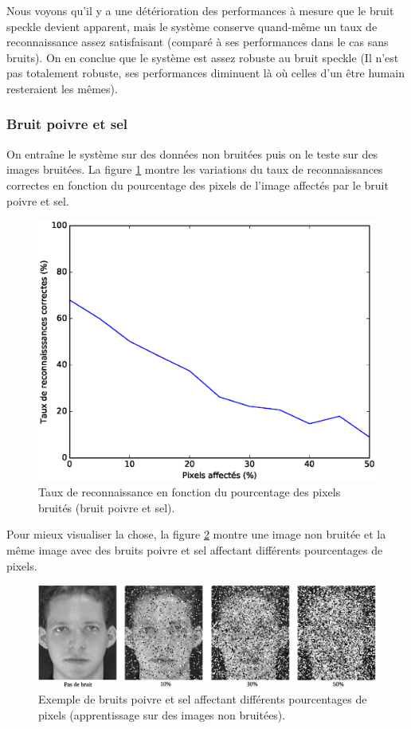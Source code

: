 Nous voyons qu'il y a une détérioration des performances à mesure que le bruit speckle
devient apparent, mais le système conserve quand-même un taux de reconnaissance assez 
satisfaisant (comparé à ses performances dans le cas sans bruits). On en conclue que le
système est assez robuste au bruit speckle (Il n'est pas totalement robuste, ses performances
diminuent là où celles d'un être humain resteraient les mêmes).

\subsubsection{Bruit poivre et sel}
On entraîne le système sur des données non bruitées puis on le teste sur des images
bruitées. La figure \ref{fig:robustness:sp:test} montre les variations du taux
de reconnaissances correctes en fonction du pourcentage des pixels de l'image affectés
par le bruit poivre et sel.
\begin{figure}[H]
    \centering
    \includegraphics[scale=0.5]{images/robustesse_sp_test}
    \caption{Taux de reconnaissance en fonction du pourcentage des pixels bruités (bruit poivre et sel).}
    \label{fig:robustness:sp:test}
\end{figure}
Pour mieux visualiser la chose, la figure \ref{fig:robustness:sp:exemple} montre
une image non bruitée et la même image avec des bruits poivre et sel affectant 
différents pourcentages de pixels.
\begin{figure}[H]
    \centering
    \includegraphics[scale=0.45]{images/robustness_sp_exemple}
    \caption{Exemple de bruits poivre et sel affectant différents pourcentages de pixels
    (apprentissage sur des images non bruitées).}
    \label{fig:robustness:sp:exemple}
\end{figure}


